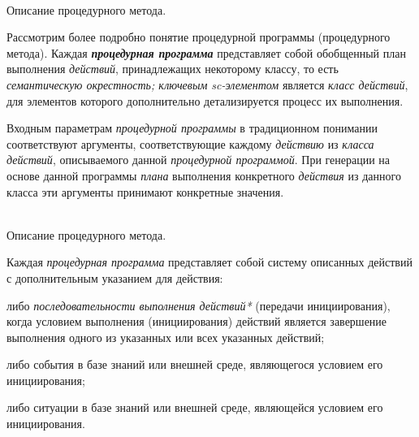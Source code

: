 \begin{frame}{\\Описание процедурного метода.}
	\topline
	\justifying
 
    \vspace{0.33cm}
    
    Рассмотрим более подробно понятие процедурной программы (процедурного метода). Каждая \textbf{\textit{процедурная программа}} представляет собой обобщенный план выполнения \textit{действий}, принадлежащих некоторому классу, то есть \textit{семантическую окрестность; ключевым sc-элементом\scnrolesign} является \textit{класс действий}, для элементов которого дополнительно детализируется процесс их выполнения.
    
    \vspace{0.33cm}
    
    Входным параметрам \textit{процедурной программы} в традиционном понимании соответствуют аргументы, соответствующие каждому \textit{действию} из \textit{класса действий}, описываемого данной \textit{процедурной программой}. При генерации на основе данной программы \textit{плана} выполнения конкретного \textit{действия} из данного класса эти аргументы принимают конкретные значения.
\end{frame}

\begin{frame}{\\Описание процедурного метода.}
	\topline
	\justifying
    \vspace{0.33cm}
    
     Каждая \textit{процедурная программа} представляет собой систему описанных действий с дополнительным указанием для действия:
    \begin{textitemize}
        \item либо \textit{последовательности выполнения действий*} (передачи инициирования), когда условием выполнения (инициирования) действий является завершение выполнения одного из указанных или всех указанных действий;
        \item либо события в базе знаний или внешней среде, являющегося условием его инициирования;
        \item либо ситуации в базе знаний или внешней среде, являющейся условием его инициирования.
    \end{textitemize}
\end{frame}

	
